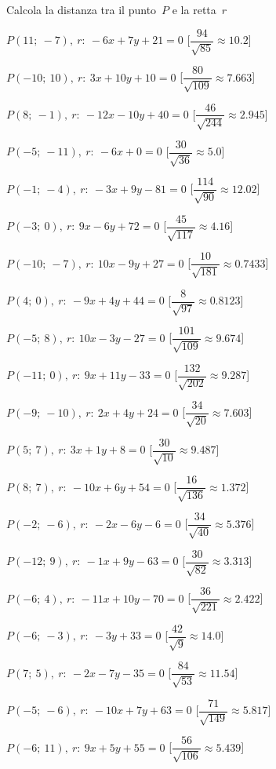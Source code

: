 \begin{esercizio}\label{ese:}
 Calcola la distanza tra il punto~$P$ e la retta~$r$
 \begin{enumeratea}
  \item  $P(11;~-7),~r:~-6 x + 7 y + 21 = 0$ \hfill 
   [$\dfrac{94}{\sqrt{85}}\approx  10.2$]
  \item  $P(-10;~10),~r:~3 x + 10 y + 10 = 0$ \hfill 
   [$\dfrac{80}{\sqrt{109}}\approx 7.663$]
  \item  $P(8;~-1),~r:~-12 x - 10 y + 40 = 0$ \hfill 
   [$\dfrac{46}{\sqrt{244}}\approx 2.945$]
  \item  $P(-5;~-11),~r:~-6 x + 0 = 0$ \hfill 
   [$\dfrac{30}{\sqrt{36}}\approx   5.0$]
  \item  $P(-1;~-4),~r:~-3 x + 9 y - 81 = 0$ \hfill 
   [$\dfrac{114}{\sqrt{90}}\approx 12.02$]
  \item  $P(-3;~0),~r:~9 x - 6 y + 72 = 0$ \hfill 
   [$\dfrac{45}{\sqrt{117}}\approx  4.16$]
  \item  $P(-10;~-7),~r:~10 x - 9 y + 27 = 0$ \hfill 
   [$\dfrac{10}{\sqrt{181}}\approx0.7433$]
  \item  $P(4;~0),~r:~-9 x + 4 y + 44 = 0$ \hfill 
   [$\dfrac{8}{\sqrt{97}}\approx0.8123$]
  \item  $P(-5;~8),~r:~10 x - 3 y - 27 = 0$ \hfill 
   [$\dfrac{101}{\sqrt{109}}\approx 9.674$]
  \item  $P(-11;~0),~r:~9 x + 11 y - 33 = 0$ \hfill 
   [$\dfrac{132}{\sqrt{202}}\approx 9.287$]
  \item  $P(-9;~-10),~r:~2 x + 4 y + 24 = 0$ \hfill 
   [$\dfrac{34}{\sqrt{20}}\approx 7.603$]
  \item  $P(5;~7),~r:~3 x + 1 y + 8 = 0$ \hfill 
   [$\dfrac{30}{\sqrt{10}}\approx 9.487$]
  \item  $P(8;~7),~r:~-10 x + 6 y + 54 = 0$ \hfill 
   [$\dfrac{16}{\sqrt{136}}\approx 1.372$]
  \item  $P(-2;~-6),~r:~-2 x - 6 y - 6 = 0$ \hfill 
   [$\dfrac{34}{\sqrt{40}}\approx 5.376$]
  \item  $P(-12;~9),~r:~-1 x + 9 y - 63 = 0$ \hfill 
   [$\dfrac{30}{\sqrt{82}}\approx 3.313$]
  \item  $P(-6;~4),~r:~-11 x + 10 y - 70 = 0$ \hfill 
   [$\dfrac{36}{\sqrt{221}}\approx 2.422$]
  \item  $P(-6;~-3),~r:~-3 y + 33 = 0$ \hfill 
   [$\dfrac{42}{\sqrt{9}}\approx  14.0$]
  \item  $P(7;~5),~r:~-2 x - 7 y - 35 = 0$ \hfill 
   [$\dfrac{84}{\sqrt{53}}\approx 11.54$]
  \item  $P(-5;~-6),~r:~-10 x + 7 y + 63 = 0$ \hfill 
   [$\dfrac{71}{\sqrt{149}}\approx 5.817$]
  \item  $P(-6;~11),~r:~9 x + 5 y + 55 = 0$ \hfill 
   [$\dfrac{56}{\sqrt{106}}\approx 5.439$]
 \end{enumeratea}
\end{esercizio}


